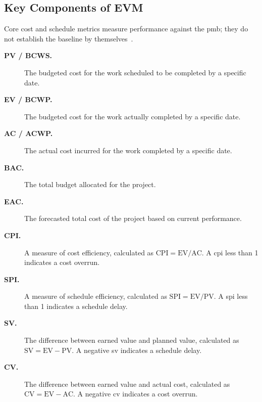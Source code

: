 \documentclass[../main.tex]{subfiles}
\begin{document}
\subsection{Key Components of EVM}
Core cost and schedule metrics measure performance against the \ac{pmb}; they do not establish the baseline by
themselves~\autocite{edo-3-6-1-evm-intro-2025,edo-3-6-2-evm-analysis-2025,DoD-IPM-EVM-Definitions-2026}.
\begin{description}
  \item[\textbf{PV / BCWS.}] The budgeted cost for the work scheduled to be completed by a specific date.
  \item[\textbf{EV / BCWP.}] The budgeted cost for the work actually completed by a specific date.
  \item[\textbf{AC / ACWP.}] The actual cost incurred for the work completed by a specific date.
  \item[\textbf{BAC.}] The total budget allocated for the project.
  \item[\textbf{EAC.}] The forecasted total cost of the project based on current performance.
  \item[\textbf{CPI.}] A measure of cost efficiency, calculated as $\text{CPI} = \text{EV} / \text{AC}$.
        A \ac{cpi} less than 1 indicates a cost overrun.
  \item[\textbf{SPI.}] A measure of schedule efficiency, calculated as $\text{SPI} = \text{EV} / \text{PV}$.
        A \ac{spi} less than 1 indicates a schedule delay.
  \item[\textbf{SV.}] The difference between earned value and planned value, calculated as
        $\text{SV} = \text{EV} - \text{PV}$. A negative \ac{sv} indicates a schedule delay.
  \item[\textbf{CV.}] The difference between earned value and actual cost, calculated as
        $\text{CV} = \text{EV} - \text{AC}$. A negative \ac{cv} indicates a cost overrun.
\end{description}
\end{document}
